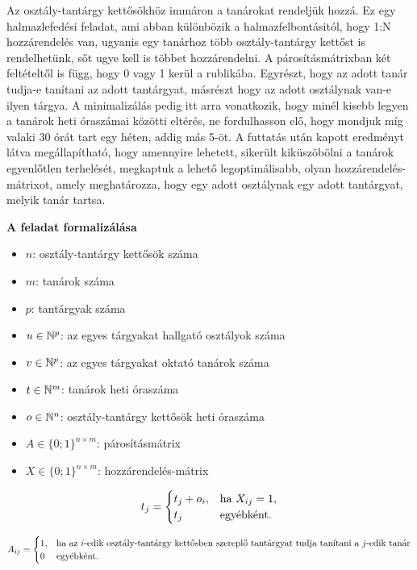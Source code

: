 \documentclass[a4paper,12pt]{article}
\begin{document}
Az osztály-tantárgy kettősökhöz immáron a tanárokat rendeljük hozzá. Ez egy halmazlefedési feladat, ami abban különbözik a halmazfelbontásitól, hogy 1:N hozzárendelés van, ugyanis egy tanárhoz több osztály-tantárgy kettőst is rendelhetünk, sőt ugye kell is többet hozzárendelni. A párosításmátrixban két feltételtől is függ, hogy 0 vagy 1 kerül a rublikába. Egyrészt, hogy az adott tanár tudja-e tanítani az adott tantárgyat, másrészt hogy az adott osztálynak van-e ilyen tárgya.
A minimalizálás pedig itt arra vonatkozik, hogy minél kisebb legyen a tanárok heti óraszámai közötti eltérés, ne fordulhasson elő, hogy mondjuk míg valaki 30 órát tart egy héten, addig más 5-öt.
A futtatás után kapott eredményt látva megállapítható, hogy amennyire lehetett, sikerült kiküszöbölni a tanárok egyenlőtlen terhelését, megkaptuk a lehető legoptimálisabb, olyan hozzárendelés-mátrixot, amely meghatározza, hogy egy adott osztálynak egy adott tantárgyat, melyik tanár tartsa.

\noindent \textbf{A feladat formalizálása}

\begin{itemize}
    \item $n$: osztály-tantárgy kettősök száma
    \item $m$: tanárok száma
    \item $p$: tantárgyak száma
    \item $u \in \Bbb{N}^p$: az egyes tárgyakat hallgató osztályok száma
    \item $v \in \Bbb{N}^p$: az egyes tárgyakat oktató tanárok száma
    \item $t \in \Bbb{N}^m$: tanárok heti óraszáma
    \item $o \in \Bbb{N}^n$: osztály-tantárgy kettősök heti óraszáma
    \item $A \in \{0;1\}^{n \times m}$: párosításmátrix
    \item $X \in \{0;1\}^{n \times m}$: hozzárendelés-mátrix
\end{itemize}

\[
t_{j} =
\begin{cases}
t_j+o_i,& \hbox{ha } X_{ij}=1, \\
t_j & \hbox{egyébként}.
\end{cases}
\]

\[
A_{ij} =
\begin{cases}
1, & \hbox{ha az $i$-edik osztály-tantárgy kettősben szereplő tantárgyat tudja tanítani a $j$-edik tanár} \\
0 & \hbox{egyébként}.
\end{cases}
\]
\end{document}
